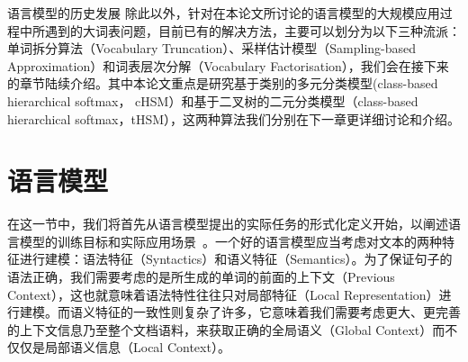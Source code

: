 语言模型的历史发展
除此以外，针对在本论文所讨论的语言模型的大规模应用过程中所遇到的大词表问题，目前已有的解决方法，主要可以划分为以下三种流派：单词拆分算法（Vocabulary Truncation）、采样估计模型（Sampling-based Approximation）和词表层次分解（Vocabulary Factorisation），我们会在接下来的章节陆续介绍。其中本论文重点是研究基于类别的多元分类模型(class-based hierarchical softmax， cHSM）和基于二叉树的二元分类模型（class-based hierarchical softmax，tHSM），这两种算法我们分别在下一章更详细讨论和介绍。

\section{语言模型}
在这一节中，我们将首先从语言模型提出的实际任务的形式化定义开始，以阐述语言模型的训练目标和实际应用场景~。一个好的语言模型应当考虑对文本的两种特征进行建模：语法特征（Syntactics）和语义特征（Semantics）。为了保证句子的语法正确，我们需要考虑的是所生成的单词的前面的上下文（Previous Context），这也就意味着语法特性往往只对局部特征（Local Representation）进行建模。而语义特征的一致性则复杂了许多，它意味着我们需要考虑更大、更完善的上下文信息乃至整个文档语料，来获取正确的全局语义（Global Context）而不仅仅是局部语义信息（Local Context）。


